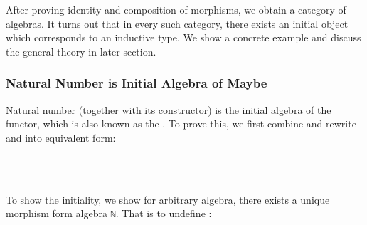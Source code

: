 After proving identity and composition of morphisms, we obtain a category of algebras. It turns out that in every such category, there exists an initial object which corresponds to an inductive type. We show a concrete example and discuss the general theory in later section.

\subsubsection*{Natural Number is Initial Algebra of Maybe}

Natural number (together with its constructor) is the initial algebra of the  functor, which is also known as the . To prove this, we first combine and rewrite  and  into equivalent form:

\begin{code}%
\>[0]\AgdaFunction{[z,s]}\AgdaSpace{}%
\AgdaSymbol{:}\AgdaSpace{}%
\AgdaSpace{}%
\AgdaSpace{}%
\AgdaSpace{}%
\AgdaSpace{}%
\<%
\\
\>[0]\AgdaFunction{[z,s]}\AgdaSpace{}%
\AgdaSymbol{(}\AgdaSpace{}%
\AgdaSymbol{)}\AgdaSpace{}%
\AgdaSymbol{=}\AgdaSpace{}%
\<%
\\
\>[0]\AgdaFunction{[z,s]}\AgdaSpace{}%
\AgdaSymbol{(}\AgdaSpace{}%
\AgdaSymbol{)}\AgdaSpace{}%
\AgdaSymbol{=}\AgdaSpace{}%
\AgdaSpace{}%
\<%
\end{code}

To show the initiality, we show for arbitrary algebra, there exists a unique morphism form algebra \texttt{ℕ}. That is to undefine :

\begin{code}%
\>[0]\AgdaSpace{}%
\AgdaSymbol{:}\AgdaSpace{}%
\AgdaSymbol{(}\AgdaSpace{}%
\AgdaSpace{}%
\AgdaSpace{}%
\AgdaSpace{}%
\AgdaSymbol{)}\AgdaSpace{}%
\AgdaSpace{}%
\AgdaSpace{}%
\AgdaSpace{}%
\<%
\\
\>[0]\AgdaSpace{}%
\AgdaSpace{}%
\AgdaSpace{}%
\AgdaSymbol{=}\AgdaSpace{}%
\AgdaSpace{}%
\AgdaSymbol{(}\AgdaSpace{}%
\AgdaSymbol{)}\<%
\\
\>[0]\AgdaSpace{}%
\AgdaSpace{}%
\AgdaSymbol{(}\AgdaSpace{}%
\AgdaSymbol{)}\AgdaSpace{}%
\AgdaSymbol{=}\AgdaSpace{}%
\AgdaSpace{}%
\AgdaSymbol{(}\AgdaSpace{}%
\AgdaSymbol{(}\AgdaSpace{}%
\AgdaSpace{}%
\AgdaSymbol{))}\<%
\end{code}

